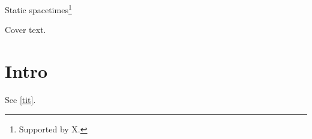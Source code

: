 \documentclass{article}
\def\title#1{\begin{center}{\large #1}\end{center}}
\begin{document}
\begin{titlepage}
\title{Static spacetimes\thanks{Supported by X.}\label{tit}}
Cover text.
\end{titlepage}
\section{Intro}
See \ref{tit}.
\end{document}
